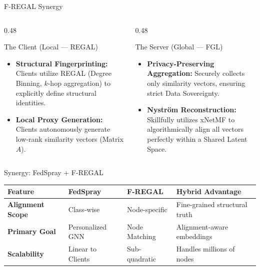 \documentclass[11pt, aspectratio=169]{beamer}
\begin{document}
\begin{frame}{F-REGAL Synergy}
    \begin{columns}[T]
        \begin{column}{0.48\textwidth}
            \begin{block}{The Client (Local --- REGAL)}
                \begin{itemize}
                    \item \textbf{Structural Fingerprinting:} Clients utilize REGAL (Degree Binning, $k$-hop aggregation) to explicitly define structural identities.
                    \item \textbf{Local Proxy Generation:} Clients autonomously generate low-rank similarity vectors (Matrix $A$).
                \end{itemize}
            \end{block}
        \end{column}
        
        \begin{column}{0.48\textwidth}
            \begin{block}{The Server (Global --- FGL)}
                \begin{itemize}
                    \item \textbf{Privacy-Preserving Aggregation:} Securely collects only similarity vectors, ensuring strict Data Sovereignty.
                    \item \textbf{Nyström Reconstruction:} Skillfully utilizes xNetMF to algorithmically align all vectors perfectly within a Shared Latent Space.
                \end{itemize}
            \end{block}
        \end{column}
    \end{columns}
\end{frame}

\begin{frame}{Synergy: FedSpray + F-REGAL}
    \begin{table}
        \centering
        \renewcommand{\arraystretch}{1.5}
        \begin{tabular}{@{}llll@{}}
            \toprule
            \textbf{Feature} & \textbf{FedSpray} & \textbf{F-REGAL} & \textbf{Hybrid Advantage} \\
            \midrule
            \textbf{Alignment Scope} & Class-wise & Node-specific & Fine-grained structural truth \\
            \textbf{Primary Goal} & Personalized GNN & Node Matching & Alignment-aware embeddings \\
            \textbf{Scalability} & Linear to Clients & Sub-quadratic & Handles millions of nodes \\
            \bottomrule
        \end{tabular}
    \end{table}
\end{frame}
\end{document}
